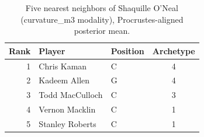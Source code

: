 \begin{table}[htbp]
  \centering\small
  \begin{tabular}{rllc}
    \toprule
    Rank & Player & Position & Archetype \\
    \midrule
    1 & Chris Kaman & C & 4 \\
    2 & Kadeem Allen & G & 4 \\
    3 & Todd MacCulloch & C & 3 \\
    4 & Vernon Macklin & C & 1 \\
    5 & Stanley Roberts & C & 1 \\
    \bottomrule
  \end{tabular}
  \caption{Five nearest neighbors of Shaquille O'Neal (curvature_m3 modality), Procrustes-aligned posterior mean.}
  \label{tab:Shaquille_O_Neal_neighbors_curvature_m3}
\end{table}


